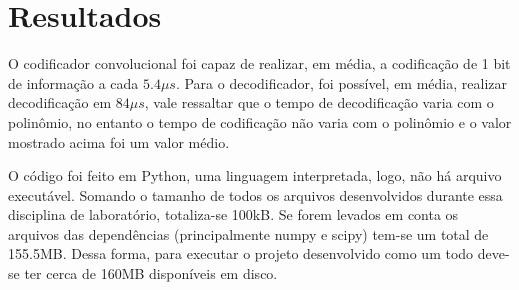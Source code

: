 \section{Resultados}
O codificador convolucional foi capaz de realizar, em média, a codificação de 1 bit de informação a cada $5.4\mu s$. Para o decodificador, foi possível, em média, realizar decodificação em $84\mu s$, vale ressaltar que o tempo de decodificação varia com o polinômio, no entanto o tempo de codificação não varia com o polinômio e o valor mostrado acima foi um valor médio.

O código foi feito em Python, uma linguagem interpretada, logo, não há arquivo executável. Somando o tamanho de todos os arquivos desenvolvidos durante essa disciplina de laboratório, totaliza-se 100kB. Se forem levados em conta os arquivos das dependências (principalmente numpy e scipy) tem-se um total de 155.5MB. Dessa forma, para executar o projeto desenvolvido como um todo deve-se ter cerca de 160MB disponíveis em disco.

